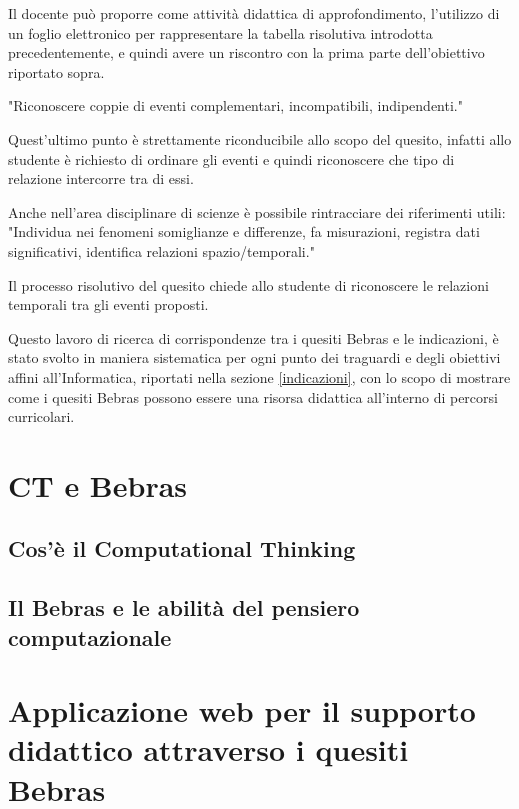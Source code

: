\documentclass[12pt]{report}
\begin{document}
\noindent Il docente può proporre come attività didattica di approfondimento, l'utilizzo di un foglio elettronico per rappresentare la tabella risolutiva introdotta precedentemente, e quindi avere un riscontro con la prima parte dell'obiettivo riportato sopra.

"Riconoscere coppie di eventi complementari, incompatibili, indipendenti."

\noindent Quest'ultimo punto è strettamente riconducibile allo scopo del quesito, infatti allo studente è richiesto di ordinare gli eventi e quindi riconoscere che tipo di relazione intercorre tra di essi.

Anche nell'area disciplinare di scienze è possibile rintracciare dei riferimenti utili:
"Individua nei fenomeni somiglianze e differenze, fa misurazioni, registra dati significativi, identifica relazioni spazio/temporali."

\noindent Il processo risolutivo del quesito chiede allo studente di riconoscere le relazioni temporali tra gli eventi proposti.

Questo lavoro di ricerca di corrispondenze tra i quesiti Bebras e le indicazioni, è stato svolto in maniera sistematica per ogni punto dei traguardi e degli obiettivi affini all'Informatica, riportati nella sezione \ref{indicazioni}, con lo scopo di mostrare come i quesiti Bebras possono essere una risorsa didattica all'interno di percorsi curricolari.




\chapter{CT e Bebras}
\label{cap3}
\section{Cos'è il Computational Thinking}

\section{Il Bebras e le abilità del pensiero computazionale}


\chapter{Applicazione web per il supporto didattico attraverso i quesiti Bebras}
\end{document}
